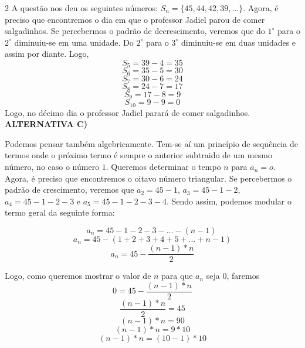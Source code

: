 \begin{solucoes}{2}
\solucao
A questão nos deu os seguintes números: $S_n=\{45,44,42,39,...\}$. Agora, é preciso que encontremos o dia em que o professor Jadiel parou de comer salgadinhos. Se percebermos o padrão de decrescimento, veremos que do $1^\circ$ para o $2^\circ$ diminuiu-se em uma unidade. Do $2^\circ$ para o $3^\circ$ diminuiu-se em duas unidades e assim por diante. Logo,
 \begin{equation*}
     S_5=39-4=35
 \end{equation*}
  \begin{equation*}
     S_6=35-5=30
 \end{equation*}
 \begin{equation*}
     S_7=30-6=24
 \end{equation*}
  \begin{equation*}
     S_8=24-7=17
 \end{equation*}
 \begin{equation*}
     S_9=17-8=9
 \end{equation*}
  \begin{equation*}
     S_{10}=9-9=0
 \end{equation*}
 Logo, no décimo dia o professor Jadiel parará de comer salgadinhos.   \\
    \textbf{ALTERNATIVA C)}

\solucao
Podemos pensar também algebricamente. Tem-se aí um princípio de sequência de termos onde o próximo termo é sempre o anterior subtraido de um mesmo número, no caso o número $1$. Queremos determinar o tempo $n$ para $a_n=o$. Agora, é preciso que encontremos o oitavo número triangular. Se percebermos o padrão de crescimento, veremos que $a_2=45-1$, $a_3=45-1-2$, $a_4=45-1-2-3$ e $a_5=45-1-2-3-4$. Sendo assim, podemos modular o termo geral da seguinte forma:
  
        \begin{equation*}
        a_n=45-1-2-3-...-(n-1) \ 
        \end{equation*}
        \begin{equation*}
        a_n=45-(1+2+3+4+5+...+n-1)
 \end{equation*}
 \begin{equation*}
     a_n= 45-\frac{(n-1)*n}{2}
 \end{equation*}
        
Logo, como queremos mostrar o valor de $n$ para que $a_n$ seja $0$, faremos
\begin{equation*}
    0=45-\frac{(n-1)*n}{2}
\end{equation*}
\begin{equation*}
    \frac{(n-1)*n}{2}=45
\end{equation*}
\begin{equation*}
    (n-1)*n=90
\end{equation*}
\begin{equation*}
    (n-1)*n=9*10
\end{equation*}
\begin{equation*}
    (n-1)*n=(10-1)*10
\end{equation*}


\end{solucoes}
